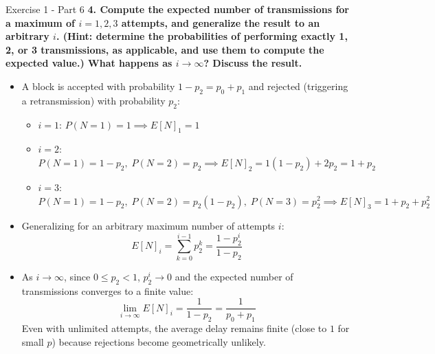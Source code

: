 \documentclass[10pt, aspectratio=169]{beamer}
\newcommand{\question}[1]{{\color{QuestionRed}\textbf{#1}}}
\begin{document}
\begin{frame}{Exercise 1 - Part 6}
	\question{4. Compute the expected number of transmissions for a maximum of $i = 1, 2, 3$ attempts, and generalize the result to an arbitrary $i$. (Hint: determine the probabilities of performing exactly 1, 2, or 3 transmissions, as applicable, and use them to compute the expected value.) What happens as $i \to \infty$? Discuss the result.}
	
	\vspace{0.1cm}
	\footnotesize
	\begin{itemize}
		\item A block is accepted with probability $1 - p_2 = p_0 + p_1$ and rejected (triggering a retransmission) with probability $p_2$:
		\begin{itemize}
			\item $i = 1$: $P(N = 1) = 1 \implies E[N]_1 = 1$
			\item $i = 2$: $P(N = 1) = 1 - p_2,\; P(N = 2) = p_2 \implies E[N]_2 = 1(1 - p_2) + 2p_2 = 1 + p_2$
			\item $i = 3$: $P(N = 1) = 1 - p_2,\; P(N = 2) = p_2(1 - p_2),\; P(N = 3) = p_2^2 \implies E[N]_3 = 1 + p_2 + p_2^2$
		\end{itemize}
		\item Generalizing for an arbitrary maximum number of attempts $i$:
		\[
		E[N]_i = \sum_{k=0}^{i-1} p_2^k = \frac{1 - p_2^i}{1 - p_2}
		\]
		\item As $i \to \infty$, since $0 \le p_2 < 1$, $p_2^i \to 0$ and the expected number of transmissions converges to a finite value:
		\[
		\lim_{i \to \infty} E[N]_i = \frac{1}{1 - p_2} = \frac{1}{p_0 + p_1}
		\]
		Even with unlimited attempts, the average delay remains finite (close to $1$ for small $p$) because rejections become geometrically unlikely.
	\end{itemize}
\end{frame}
\end{document}
